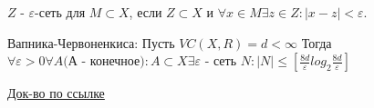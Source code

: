 \Def $Z$ - $\varepsilon$-сеть для $M \subset X$, если $Z \subset X$ и $\forall x \in M \exists z \in Z: |x - z| < \varepsilon$. 

\Th Вапника-Червоненкиса: Пусть $VC(X, R) = d < \infty$ Тогда $\forall \varepsilon > 0 \forall A \text{(А - конечное)}: A \subset X \exists \varepsilon$ - сеть $N: |N| \leqslant [\frac{8d}{\varepsilon}log_2\frac{8d}{\varepsilon}]$

\Proof 
\href{https://www.youtube.com/watch?v=dQw4w9WgXcQ}{Док-во по ссылке}
\EndProof

